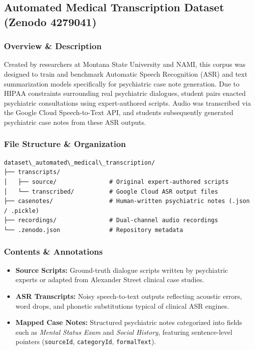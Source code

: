 \subsection{Automated Medical Transcription Dataset (Zenodo 4279041)}
\label{subsec:zenodo\_dataset}

\subsubsection*{Overview \& Description}
Created by researchers at Montana State University and NAMI, this corpus was designed to train and benchmark Automatic Speech Recognition (ASR) and text summarization models specifically for psychiatric case note generation. Due to HIPAA constraints surrounding real psychiatric dialogues, student pairs enacted psychiatric consultations using expert-authored scripts. Audio was transcribed via the Google Cloud Speech-to-Text API, and students subsequently generated psychiatric case notes from these ASR outputs.

\subsubsection*{File Structure \& Organization}
\begin{verbatim}
dataset\_automated\_medical\_transcription/
├── transcripts/
│   ├── source/               # Original expert-authored scripts
│   └── transcribed/          # Google Cloud ASR output files
├── casenotes/                # Human-written psychiatric notes (.json / .pickle)
├── recordings/               # Dual-channel audio recordings
└── .zenodo.json              # Repository metadata
\end{verbatim}

\subsubsection*{Contents \& Annotations}
\begin{itemize}
    \item \textbf{Source Scripts:} Ground-truth dialogue scripts written by psychiatric experts or adapted from Alexander Street clinical case studies.
    \item \textbf{ASR Transcripts:} Noisy speech-to-text outputs reflecting acoustic errors, word drops, and phonetic substitutions typical of clinical ASR engines.
    \item \textbf{Mapped Case Notes:} Structured psychiatric notes categorized into fields such as \textit{Mental Status Exam} and \textit{Social History}, featuring sentence-level pointers (\texttt{sourceId}, \texttt{categoryId}, \texttt{formalText}).
\end{itemize}

